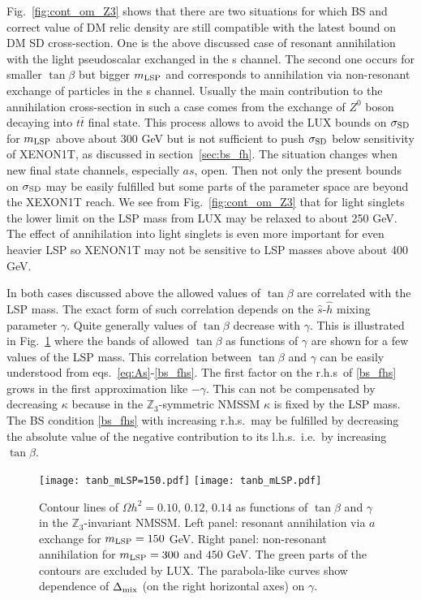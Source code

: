 \documentclass[12pt,twoside]{article}
\begin{document}
Fig.~\ref{fig:cont_om_Z3} shows that there are two situations for which
BS and correct value of DM relic density are still compatible with the 
latest bound on DM SD cross-section. One is the above discussed 
case of resonant annihilation with the light pseudoscalar exchanged 
in the s channel. The second one occurs for smaller $\tan\beta$ but 
bigger $m_{\rm LSP}$ and corresponds to annihilation via
non-resonant exchange of particles in the s channel. Usually the main 
contribution to the annihilation cross-section in such a case comes 
from the exchange of $Z^0$ boson decaying into $t\bar{t}$ final state. This process 
allows to avoid the LUX bounds on $\sigma_{\rm SD}$ for $m_{\rm LSP}
$ above about 300 GeV but is not sufficient to push $\sigma_{\rm SD}$ below
sensitivity of XENON1T, as discussed in section~\ref{sec:bs_fh}.
The situation changes when new final state channels, especially $as$, open.
Then not only the present bounds on $\sigma_{\rm SD}$  may be easily 
fulfilled but some parts of the parameter space are beyond the XEXON1T 
reach. We see from Fig.~\ref{fig:cont_om_Z3} that for light singlets the lower limit on the LSP mass from LUX may be relaxed to about 250 GeV. The
effect of annihilation into light singlets is even more important for even heavier LSP so XENON1T may not be sensitive to LSP masses above about 400
GeV.



In both cases discussed above the allowed values of $\tan\beta$ are 
correlated with the LSP mass. The exact form of such correlation depends 
on the $\hat{s}$-$\hat{h}$ mixing parameter $\gamma$. Quite generally values of 
$\tan\beta$ decrease with $\gamma$. 
This is illustrated in Fig.~\ref{fig:tanb_mLSP_Z3}
where the bands of allowed $\tan\beta$ as functions of $\gamma$ are
shown for a few values of the LSP mass. 
This correlation between $\tan\beta$ and $\gamma$ can be easily 
understood from eqs.~\eqref{eq:As}-\eqref{bs_fhs}. The first factor 
on the r.h.s~of \eqref{bs_fhs} grows in the first approximation
like $-\gamma$. This can not be compensated by decreasing $\kappa$ 
because in the $\mathbb{Z}_3$-symmetric NMSSM $\kappa$ is fixed 
by the LSP mass. The BS condition \eqref{bs_fhs} with increasing r.h.s.\
may be fulfilled by decreasing the absolute value of the negative
contribution to its l.h.s.\ i.e.\ by increasing $\tan\beta$.

%
%
\begin{figure}[t]
\center
\texttt{[image: tanb\_mLSP=150.pdf]}
\texttt{[image: tanb\_mLSP.pdf]}
\caption{Contour lines of $\Omega h^2=0.10,\,0.12,\,0.14$ as functions of $\tan\beta$ and $\gamma$ in the $\mathbb{Z}_3$-invariant NMSSM. Left panel: 
resonant annihilation via $a$ exchange for $m_{\rm LSP}=150$ GeV. Right panel: non-resonant annihilation for $m_{\rm
LSP}=300$ and $450$ GeV. The green parts of the contours are excluded by LUX. The parabola-like curves show dependence of $\Delta_{\rm mix}$ (on the
right horizontal axes) on $\gamma$. }
\label{fig:tanb_mLSP_Z3}
\end{figure}
%
%
\end{document}
